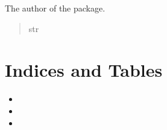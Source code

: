 \documentclass[letterpaper,10pt,english]{sphinxmanual}
\begin{document}

\begin{fulllineitems}
\label{\detokenize{pages_app:pages_app.__author__}}
\pysigstartsignatures
\pysigline
{}
\pysigstopsignatures
\sphinxAtStartPar
The author of the package.
\begin{quote}\begin{description}
\sphinxAtStartPar
str

\end{description}\end{quote}

\end{fulllineitems}



\chapter{Indices and Tables}
\label{\detokenize{index:indices-and-tables}}\begin{itemize}
\item {} 
\sphinxAtStartPar
{}

\item {} 
\sphinxAtStartPar
{}

\item {} 
\sphinxAtStartPar
{}

\end{itemize}
\end{document}
